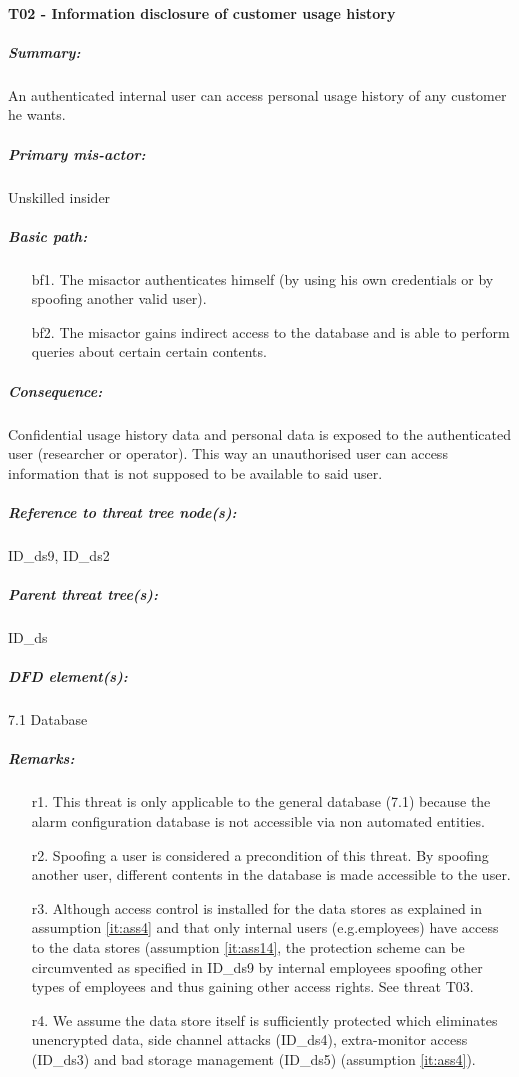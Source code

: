 

\paragraph{T02 - Information disclosure of customer usage history}
    \subparagraph{Summary:} An authenticated internal user can access personal usage history of any customer he wants.
    \subparagraph{Primary mis-actor:} Unskilled insider
    \subparagraph{Basic path:}
    \begin{enumerate}
        \item[bf1.]{The misactor authenticates himself (by using his own credentials or by spoofing another valid user).}
        \item[bf2.]{The misactor gains indirect access to the database and is able to perform queries about certain certain contents.}
    \end{enumerate}
    \subparagraph{Consequence:}
	Confidential usage history data and personal data is exposed to the authenticated user (researcher or operator). This way an unauthorised user can access information that is not supposed to be available to said user.

    \subparagraph{Reference to threat tree node(s):} ID\_ds9, ID\_ds2
    \subparagraph{Parent threat tree(s):} ID\_ds
    \subparagraph{DFD element(s):}7.1 Database
    \subparagraph{Remarks:}
    \begin{enumerate}
        \item[r1.] This threat is only applicable to the general database (7.1) because the alarm configuration database is not accessible via non automated entities. 
        \item[r2.] Spoofing a user is considered a precondition of this threat. By spoofing another user, different contents in the database is made accessible to the user.
	\item[r3.] Although access control is installed for the data stores as explained in assumption \ref{it:ass4} and that only internal users (e.g.employees) have access to the data stores (assumption \ref{it:ass14}, 
the protection scheme can be circumvented as specified in ID\_ds9 by internal employees spoofing other types of employees and thus gaining other access rights. See threat T03.
	\item[r4.] We assume the data store itself is sufficiently protected which eliminates unencrypted data, side channel attacks (ID\_ds4), extra-monitor access (ID\_ds3) and bad storage management (ID\_ds5) (assumption \ref{it:ass4}).

    \end{enumerate}



